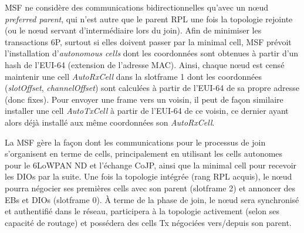 \documentclass[]{report}
\begin{document}
\vspace{0.4cm}

\par MSF ne considère des communications bidirectionnelles qu'avec un nœud \textit{preferred parent}, qui n'est autre que le parent RPL une fois la topologie rejointe (ou le nœud servant d'intermédiaire lors du join). Afin de minimiser les transactions 6P, surtout si elles doivent passer par la minimal cell, MSF prévoit l'installation d'\textit{autonomous cells} dont les coordonnées sont obtenues à partir d'un hash de l'EUI-64 (extension de l'adresse MAC). Ainsi, chaque nœud est censé maintenir une cell \textit{AutoRxCell} dans la slotframe 1 dont les coordonnées (\textit{slotOffset}, \textit{channelOffset}) sont calculées à partir de l'EUI-64 de sa propre adresse (donc fixes). Pour envoyer une frame vers un voisin, il peut de façon similaire installer une cell \textit{AutoTxCell} à partir de l'EUI-64 de ce voisin, ce dernier ayant alors déjà installé aux même coordonnées son \textit{AutoRxCell}.\\

\par La MSF gère la façon dont les communications pour le processus de join s'organisent en terme de cells, principalement en utilisant les cells autonomes pour le 6LoWPAN ND et l'échange CoJP, ainsi que la minimal cell pour recevoir les DIOs par la suite. Une fois la topologie intégrée (rang RPL acquis), le nœud pourra négocier ses premières cells avec son parent (slotframe 2) et annoncer des EBs et DIOs (slotframe 0). À terme de la phase de join, le nœud sera synchronisé et authentifié dans le réseau, participera à la topologie activement (selon ses capacité de routage) et possédera des cells Tx négociées vers/depuis son parent.\\
\end{document}
